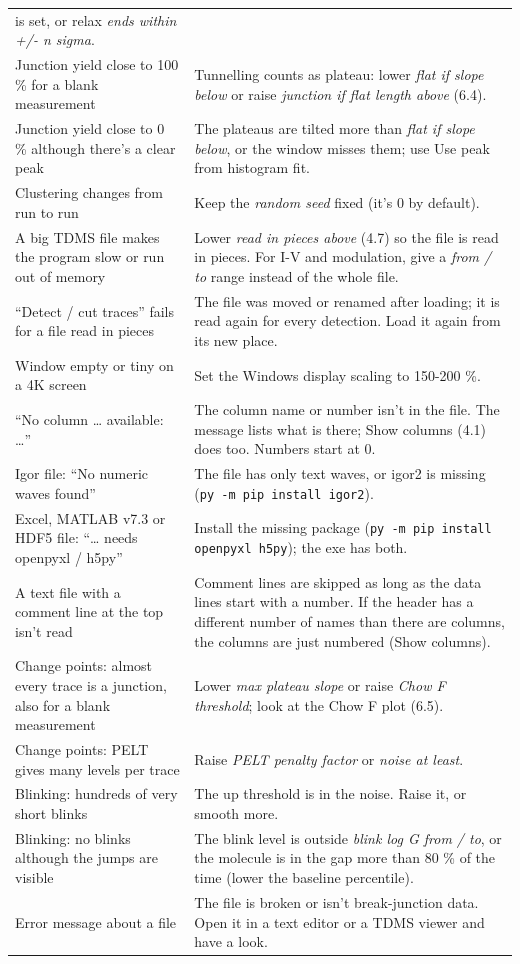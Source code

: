 \documentclass[
  11pt,
  a4paper,
]{article}
\begin{document}
\begin{longtable}[]{@{}
  >{\raggedright\arraybackslash}p{}
  >{\raggedright\arraybackslash}p{}@{}}
{centre} is set, or relax \emph{ends within +/- n sigma}. \\
Junction yield close to 100 \% for a blank measurement & Tunnelling
counts as plateau: lower \emph{flat if slope below} or raise
\emph{junction if flat length above} (6.4). \\
Junction yield close to 0 \% although there's a clear peak & The
plateaus are tilted more than \emph{flat if slope below}, or the window
misses them; use Use peak from histogram fit. \\
Clustering changes from run to run & Keep the \emph{random seed} fixed
(it's 0 by default). \\
A big TDMS file makes the program slow or run out of memory & Lower
\emph{read in pieces above} (4.7) so the file is read in pieces. For I-V
and modulation, give a \emph{from / to} range instead of the whole
file. \\
``Detect / cut traces'' fails for a file read in pieces & The file was
moved or renamed after loading; it is read again for every detection.
Load it again from its new place. \\
Window empty or tiny on a 4K screen & Set the Windows display scaling to
150-200 \%. \\
``No column \ldots{} available: \ldots{}'' & The column name or number
isn't in the file. The message lists what is there; Show columns (4.1)
does too. Numbers start at 0. \\
Igor file: ``No numeric waves found'' & The file has only text waves, or
igor2 is missing (\texttt{py -m pip install igor2}). \\
Excel, MATLAB v7.3 or HDF5 file: ``\ldots{} needs openpyxl / h5py'' &
Install the missing package (\texttt{py -m pip install openpyxl h5py});
the exe has both. \\
A text file with a comment line at the top isn't read & Comment lines
are skipped as long as the data lines start with a number. If the header
has a different number of names than there are columns, the columns are
just numbered (Show columns). \\
Change points: almost every trace is a junction, also for a blank
measurement & Lower \emph{max plateau slope} or raise \emph{Chow F
threshold}; look at the Chow F plot (6.5). \\
Change points: PELT gives many levels per trace & Raise \emph{PELT
penalty factor} or \emph{noise at least}. \\
Blinking: hundreds of very short blinks & The up threshold is in the
noise. Raise it, or smooth more. \\
Blinking: no blinks although the jumps are visible & The blink level is
outside \emph{blink log G from / to}, or the molecule is in the gap more
than 80 \% of the time (lower the baseline percentile). \\
Error message about a file & The file is broken or isn't break-junction
data. Open it in a text editor or a TDMS viewer and have a look. \\
\end{longtable}
\end{document}
